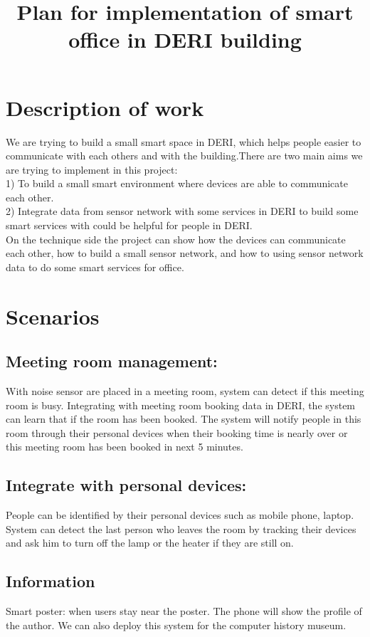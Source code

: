 \documentclass[a4paper]{llncs}
\begin{document}
\title{Plan for implementation of smart office in DERI building}
\maketitle
\section{Description of work}
We are trying to build a small smart space in DERI, which helps people easier to communicate with each others and with the building.There are two main aims we are trying to implement in this project:\\
1) To build a small smart environment where devices are able to communicate each other.\\
2) Integrate data from sensor network with some services in DERI to build some smart services with could be helpful for people in DERI.\\
On the technique side the project can show how the devices can communicate each other, how to build a small sensor network, and how to using sensor network data to do some smart services for office.
\section{Scenarios}
\subsection{Meeting room management: }
 With noise sensor are placed in a meeting room, system can detect if this meeting room is busy. Integrating with meeting room booking data in DERI, the system can learn that if the room has been booked. The system will notify people in this room through their personal devices when their booking time is nearly over or this meeting room has been booked in next 5 minutes.
\subsection{Integrate with personal devices: }
People can be identified by their personal devices such as mobile phone, laptop.  System can detect the last person who leaves the room by tracking their devices and ask him to turn off the lamp or the heater if they are still on.
\subsection{Information~\cite{survey:2010}}
Smart poster: when users stay near the poster. The phone will show the profile of the author. We can also deploy this system for the computer history museum.\\
\end{document}
